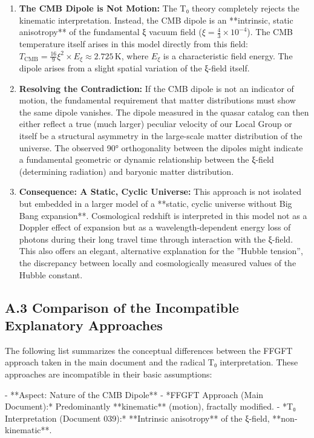 	\begin{enumerate}
		\item \textbf{The CMB Dipole is Not Motion:} The T₀ theory completely rejects the kinematic interpretation. Instead, the CMB dipole is an **intrinsic, static anisotropy** of the fundamental ξ vacuum field ($ \xi = \frac{4}{3} \times 10^{-4} $). The CMB temperature itself arises in this model directly from this field: $ T_{\text{CMB}} = \frac{16}{9} \xi^2 \times E_\xi \approx 2.725 \, \text{K} $, where $E_\xi$ is a characteristic field energy. The dipole arises from a slight spatial variation of the ξ-field itself.
		
		\item \textbf{Resolving the Contradiction:} If the CMB dipole is not an indicator of motion, the fundamental requirement that matter distributions must show the same dipole vanishes. The dipole measured in the quasar catalog can then either reflect a true (much larger) peculiar velocity of our Local Group or itself be a structural asymmetry in the large-scale matter distribution of the universe. The observed 90° orthogonality between the dipoles might indicate a fundamental geometric or dynamic relationship between the ξ-field (determining radiation) and baryonic matter distribution.
		
		\item \textbf{Consequence: A Static, Cyclic Universe:} This approach is not isolated but embedded in a larger model of a **static, cyclic universe without Big Bang expansion**. Cosmological redshift is interpreted in this model not as a Doppler effect of expansion but as a wavelength-dependent energy loss of photons during their long travel time through interaction with the ξ-field. This also offers an elegant, alternative explanation for the ''Hubble tension'', the discrepancy between locally and cosmologically measured values of the Hubble constant.
	\end{enumerate}
	
	\subsection*{A.3 Comparison of the Incompatible Explanatory Approaches}
	
	The following list summarizes the conceptual differences between the FFGFT approach taken in the main document and the radical T₀ interpretation. These approaches are incompatible in their basic assumptions:
	
	- **Aspect: Nature of the CMB Dipole**
	- *FFGFT Approach (Main Document):* Predominantly **kinematic** (motion), fractally modified.
	- *T₀ Interpretation (Document 039):* **Intrinsic anisotropy** of the ξ-field, **non-kinematic**.
	

